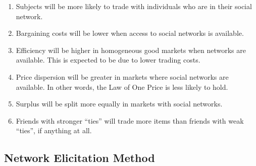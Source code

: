 \documentclass{article}
\begin{document}
\begin{enumerate}[{Hypothesis} 1]
    \item Subjects will be more likely to trade with individuals who are in
        their social network.

    \item Bargaining costs will be lower when access to social networks is
        available.

    \item Efficiency will be higher in homogeneous good markets when networks
        are available. This is expected to be due to lower trading costs.

    \item Price dispersion will be greater in markets where social networks are
        available. In other words, the Law of One Price is less likely to hold.

    \item Surplus will be split more equally in markets with social networks.

    \item Friends with stronger ``ties'' will trade more items than friends with
        weak ``ties'', if anything at all.
\end{enumerate}





\subsection{Network Elicitation Method}





\end{document}
